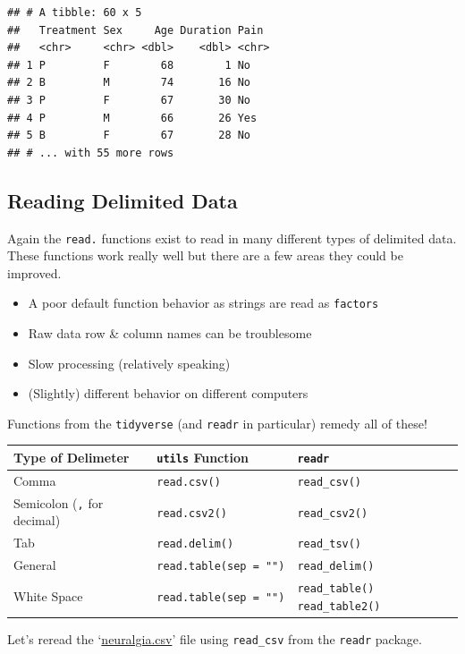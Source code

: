 \documentclass[
]{book}
\theoremstyle{definition}
\theoremstyle{definition}
\theoremstyle{definition}
\theoremstyle{remark}
\begin{document}
\begin{verbatim}
## # A tibble: 60 x 5
##   Treatment Sex     Age Duration Pain 
##   <chr>     <chr> <dbl>    <dbl> <chr>
## 1 P         F        68        1 No   
## 2 B         M        74       16 No   
## 3 P         F        67       30 No   
## 4 P         M        66       26 Yes  
## 5 B         F        67       28 No   
## # ... with 55 more rows
\end{verbatim}

\hypertarget{reading-delimited-data}{%
\subsection{Reading Delimited Data}\label{reading-delimited-data}}

Again the \texttt{read.} functions exist to read in many different types of delimited data. These functions work really well but there are a few areas they could be improved.

\begin{itemize}
\item
  A poor default function behavior as strings are read as \texttt{factors}
\item
  Raw data row \& column names can be troublesome
\item
  Slow processing (relatively speaking)
\item
  (Slightly) different behavior on different computers
\end{itemize}

Functions from the \texttt{tidyverse} (and \texttt{readr} in particular) remedy all of these!

\begin{longtable}[]{@{}lll@{}}
\toprule
Type of Delimeter & \texttt{utils} Function & \texttt{readr}\tabularnewline
\midrule
\endhead
Comma & \texttt{read.csv()} & \texttt{read\_csv()}\tabularnewline
Semicolon (\texttt{,} for decimal) & \texttt{read.csv2()} & \texttt{read\_csv2()}\tabularnewline
Tab & \texttt{read.delim()} & \texttt{read\_tsv()}\tabularnewline
General & \texttt{read.table(sep\ =\ "")} & \texttt{read\_delim()}\tabularnewline
White Space & \texttt{read.table(sep\ =\ "")} & \texttt{read\_table()} \texttt{read\_table2()}\tabularnewline
\bottomrule
\end{longtable}

Let's reread the `\href{https://www4.stat.ncsu.edu/~online/datasets/neuralgia.csv}{neuralgia.csv}' file using \texttt{read\_csv} from the \texttt{readr} package.
\end{document}
